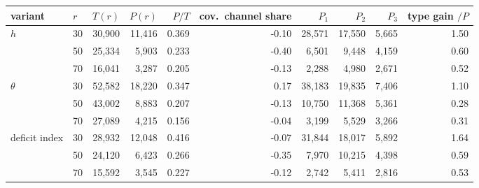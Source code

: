 \begin{tabular}{llrrrrrrrr}
\toprule
variant & $r$ & $T(r)$ & $P(r)$ & $P/T$ & cov.\ channel share & $P_1$ & $P_2$ & $P_3$ & type gain $/P$ \\
\midrule
$h$ & 30 & 30,900 & 11,416 & 0.369 & -0.10 & 28,571 & 17,550 & 5,665 & 1.50 \\
 & 50 & 25,334 & 5,903 & 0.233 & -0.40 & 6,501 & 9,448 & 4,159 & 0.60 \\
 & 70 & 16,041 & 3,287 & 0.205 & -0.13 & 2,288 & 4,980 & 2,671 & 0.52 \\
$\theta$ & 30 & 52,582 & 18,220 & 0.347 & 0.17 & 38,183 & 19,835 & 7,406 & 1.10 \\
 & 50 & 43,002 & 8,883 & 0.207 & -0.13 & 10,750 & 11,368 & 5,361 & 0.28 \\
 & 70 & 27,089 & 4,215 & 0.156 & -0.04 & 3,199 & 5,529 & 3,266 & 0.31 \\
deficit index & 30 & 28,932 & 12,048 & 0.416 & -0.07 & 31,844 & 18,017 & 5,892 & 1.64 \\
 & 50 & 24,120 & 6,423 & 0.266 & -0.35 & 7,970 & 10,215 & 4,398 & 0.59 \\
 & 70 & 15,592 & 3,545 & 0.227 & -0.12 & 2,742 & 5,411 & 2,816 & 0.53 \\
\bottomrule
\end{tabular}
